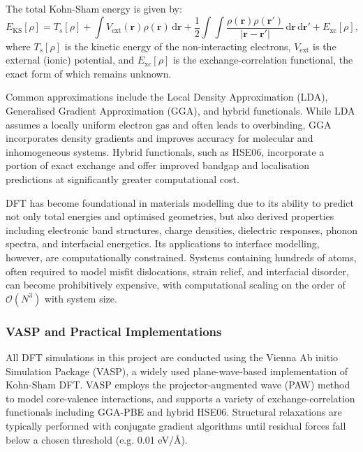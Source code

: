 The total Kohn-Sham energy is given by: \begin{equation} E_{\mathrm{KS}}[\rho] = T_s[\rho] + \int V_{\mathrm{ext}}(\mathbf{r}) \rho(\mathbf{r}) \, \mathrm{d}\mathbf{r} + \frac{1}{2} \int \int \frac{\rho(\mathbf{r}) \rho(\mathbf{r'})}{|\mathbf{r} - \mathbf{r'}|} \, \mathrm{d}\mathbf{r} \, \mathrm{d}\mathbf{r'} + E_{\mathrm{xc}}[\rho], \end{equation} where $T_s[\rho]$ is the kinetic energy of the non-interacting electrons, $V_{\mathrm{ext}}$ is the external (ionic) potential, and $E_{\mathrm{xc}}[\rho]$ is the exchange-correlation functional, the exact form of which remains unknown.

Common approximations include the Local Density Approximation (LDA), Generalised Gradient Approximation (GGA), and hybrid functionals. While LDA assumes a locally uniform electron gas and often leads to overbinding, GGA incorporates density gradients and improves accuracy for molecular and inhomogeneous systems. Hybrid functionals, such as HSE06, incorporate a portion of exact exchange and offer improved bandgap and localisation predictions at significantly greater computational cost.

DFT has become foundational in materials modelling due to its ability to predict not only total energies and optimised geometries, but also derived properties including electronic band structures, charge densities, dielectric responses, phonon spectra, and interfacial energetics. Its applications to interface modelling, however, are computationally constrained. Systems containing hundreds of atoms, often required to model misfit dislocations, strain relief, and interfacial disorder, can become prohibitively expensive, with computational scaling on the order of $\mathcal{O}(N^3)$ with system size.

\subsubsection{VASP and Practical Implementations}

All DFT simulations in this project are conducted using the Vienna Ab initio Simulation Package (VASP), a widely used plane-wave-based implementation of Kohn-Sham DFT. VASP employs the projector-augmented wave (PAW) method to model core-valence interactions, and supports a variety of exchange-correlation functionals including GGA-PBE and hybrid HSE06. Structural relaxations are typically performed with conjugate gradient algorithms until residual forces fall below a chosen threshold (e.g. 0.01 eV/\AA).

